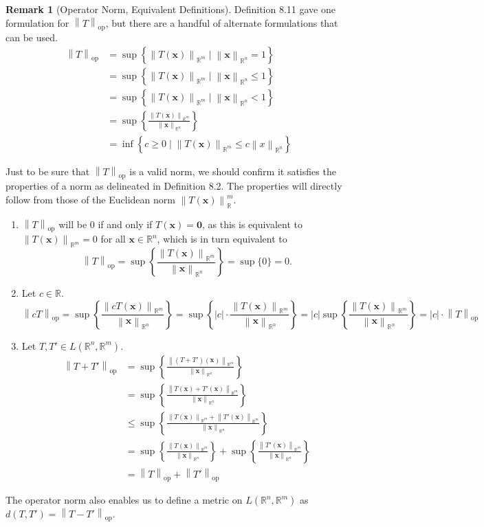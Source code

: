 \documentclass{article}
\newcommand{\R}{\mathbb{R}}
\newcommand{\x}{\mathbf{x}}
\newcommand{\ze}{\mathbf{0}}
\newcommand{\norm}[1]{\left\lVert#1\right\rVert}
\newcommand{\normop}[1]{\left\lVert#1\right\rVert_\text{op}}
\theoremstyle{definition}
\newtheorem{remark}{Remark}[section]
\begin{document}
\begin{remark}[Operator Norm, Equivalent Definitions]
	Definition 8.11 gave one formulation for $ \norm{T}_\text{op} $, but there are a handful of alternate formulations that can be used. 
	\begin{align*}
		\norm{T}_\text{op} &  = \sup\left\{\norm{T(\x)}_{\R^m}\mid \norm{\x}_{\R^n} = 1\right\} \\
		&  =  \sup\left\{\norm{T(\x)}_{\R^m}\mid \norm{\x}_{\R^n} \le 1\right\} \\
		&  =  \sup\left\{\norm{T(\x)}_{\R^m}\mid \norm{\x}_{\R^n} < 1\right\} \\ 
		&  =  \sup\left\{\frac{\norm{T(\x)}_{\R^m}}{\norm{\x}_{\R^n}}\right\} \\
		& =\inf\left\{c\ge 0\mid \norm{T(\x)}_{\R^m} \le c\norm{x}_{\R^n}\right\}
	\end{align*}
\end{remark}

Just to be sure that $ \normop{T} $ is a valid norm, we should confirm it satisfies the properties of a norm as delineated in Definition 8.2. The properties will directly follow from those of the Euclidean norm $ \norm{T(\x)}_\R^m $. 
\begin{enumerate}
	\item $ \normop{T} $ will be $ 0 $ if and only if $ T(\x)=\ze $, as this is equivalent to $ \norm{T(\x)}_{\R^m} = 0 $ for all $ \x\in\R^n $, which is in turn equivalent to  
	$$ \normop{T} = \sup\left\{\frac{\norm{T(\x)}_{\R^m}}{\norm{\x}_{\R^n}}\right\} = \sup\{0\} = 0.$$
	\item Let $ c\in \R $. 
	$$ \normop{cT} =\sup\left\{\frac{\norm{cT(\x)}_{\R^m}}{\norm{\x}_{\R^n}}\right\} = \sup \left\{|c|\cdot\frac{\norm{T(\x)}_{\R^m}}{\norm{\x}_{\R^n}}\right\} = |c| \sup\left\{\frac{\norm{T(\x)}_{\R^m}}{\norm{\x}_{\R^n}}\right\} =  |c|\cdot \normop{T}$$
	\item Let $ T,T'\in L(\R^n,\R^m) $.
	\begin{align*}
		\normop{T + T'} &= \sup\left\{\frac{\norm{(T + T')(\x)}_{\R^m}}{\norm{\x}_{\R^n}}\right\} \\
		& =  \sup\left\{\frac{\norm{T(\x) + T'(\x)}_{\R^m}}{\norm{\x}_{\R^n}}\right\} \\ 
		& \le  \sup\left\{\frac{\norm{T(\x)}_{\R^m} + \norm{T'(\x)}_{\R^m} }{\norm{\x}_{\R^n}}\right\} \\ 
		& =\sup\left\{\frac{\norm{T(\x)}_{\R^m}}{\norm{\x}_{\R^n}}\right\}  +  \sup\left\{\frac{\norm{T'(\x)}_{\R^m}}{\norm{\x}_{\R^n}}\right\} \\ 
		& = \normop{T }+ \normop{T'}
	\end{align*}
\end{enumerate}
The operator norm also enables us to define a metric on $ L(\R^n,\R^m) $ as $ d(T,T') = \normop{T-T'} $.
\end{document}
